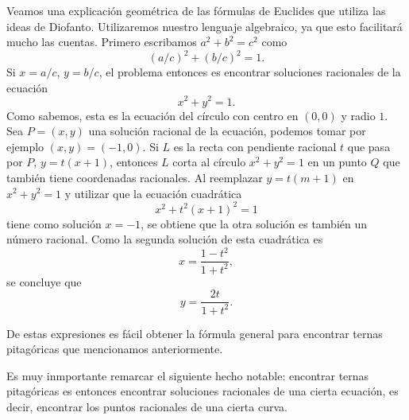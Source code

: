 Veamos una explicación geométrica de las fórmulas de Euclides que utiliza las
ideas de Diofanto. Utilizaremos nuestro lenguaje algebraico, ya que esto
facilitará mucho las cuentas.  Primero escribamos $a^2+b^2=c^2$ como
\[
	\left(a/c\right)^2+\left(b/c\right)^2=1.
\]
Si $x=a/c$, $y=b/c$, el problema entonces es encontrar soluciones racionales de 
la ecuación 
\[
	x^2+y^2=1.
\]
Como sabemos, esta es la ecuación del círculo con centro en $(0,0)$ y radio
$1$.  Sea $P=(x,y)$ una solución racional de la ecuación, podemos tomar por
ejemplo $(x,y)=(-1,0)$. Si $L$ es la recta con pendiente racional $t$ que pasa
por $P$, $y=t(x+1)$, entonces $L$ corta al círculo $x^2+y^2=1$ en un punto $Q$
que también tiene coordenadas racionales. Al reemplazar $y=t(m+1)$ en
$x^2+y^2=1$ y utilizar que la ecuación cuadrática
\[
	x^2+t^2(x+1)^2=1
\]
tiene como solución $x=-1$, se obtiene que la otra solución es también un
número racional. Como la segunda solución de esta cuadrática es
\[
	x=\frac{1-t^2}{1+t^2},
\]
se concluye que \[
	y=\frac{2t}{1+t^2}.
\]

De estas expresiones es fácil obtener la fórmula general para encontrar ternas
pitagóricas que mencionamos anteriormente. 

Es muy inmportante remarcar el siguiente hecho notable: encontrar ternas
pitagóricas es entonces encontrar soluciones racionales de una cierta ecuación, 
es decir, encontrar los puntos racionales de una cierta curva. 


